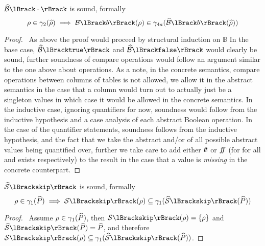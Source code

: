 \begin{conjecture}\label{thm:sound-bool}
    $\absboolsem{\cdot}$ is sound, formally
    \begin{equation*}
        \environment \in \concrete_2(\ab{\environment}) \implies \boolsem{b}(\environment) \in \concrete_{4a}(\absboolsem{b}(\ab{\environment}))
    \end{equation*}
\end{conjecture}


\begin{proof}
    \pfsketch\
    As above the proof would proceed by structural induction on $\mathbb{B}$
    In the base case, $\absboolsem{\texttt{true}}$ and $\absboolsem{\texttt{false}}$ would clearly be sound, further soundness of compare operations would follow an argument similar to the one above about operations.
    As a note, in the concrete semantics, compare operations between columns of tables is not allowed, we allow it in the abstract semantics in the case that a column would turn out to actually just be a singleton values in which case it would be allowed in the concrete semantics.
    In the inductive case, ignoring quantifiers for now, soundness would follow from the inductive hypothesis and a case analysis of each abstract Boolean operation.
    In the case of the quantifier statements, soundness follows from the inductive hypothesis, and the fact that we take the abstract and/or of all possible abstract values being quantified over, further we take care to add either $t\!t$ or $f\!\!f$ (for for all and exists respectively) to the result in the case that a value is \emph{missing} in the concrete counterpart.
\end{proof}


\begin{conjecture}
    \label{thm:sound-skip}
    $\abssem{\texttt{skip}}$ is sound, formally
    \begin{equation*}
    \environment \in \concrete_1(\ab{P}) \implies \sem{\texttt{skip}}(\environment) \subseteq \concrete_1(\abssem{\texttt{skip}}(\ab{P}))
    \end{equation*}
\end{conjecture}

\begin{proof}
    \pf\ Assume $\rho \in \gamma_1(\widehat{P})$, then $\sem{\texttt{skip}}(\rho) = \{\rho\}$ and $\abssem{\texttt{skip}}(\ab{P}) = \ab{P}$, and therefore $\sem{\texttt{skip}}(\rho) \subseteq \concrete_1(\abssem{\texttt{skip}}(\ab{P}))$.
\end{proof}


